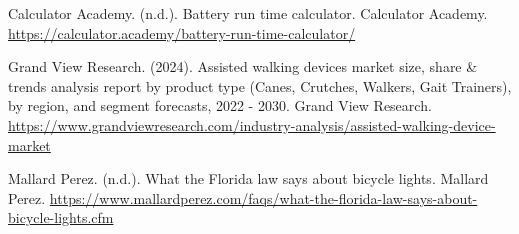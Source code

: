 \begin{thebibliography}{45}
	 Calculator Academy. (n.d.). Battery run time calculator. Calculator Academy. \href{https://calculator.academy/battery-run-time-calculator/}{https://calculator.academy/battery-run-time-calculator/}
	
	 Grand View Research. (2024). Assisted walking devices market size, share \& trends analysis report by product type (Canes, Crutches, Walkers, Gait Trainers), by region, and segment forecasts, 2022 - 2030. Grand View Research. \href{https://www.grandviewresearch.com/industry-analysis/assisted-walking-device-market}{https://www.grandviewresearch.com/industry-analysis/assisted-walking-device-market}
	
	 Mallard Perez. (n.d.). What the Florida law says about bicycle lights. Mallard Perez. \href{https://www.mallardperez.com/faqs/what-the-florida-law-says-about-bicycle-lights.cfm}{https://www.mallardperez.com/faqs/what-the-florida-law-says-about-bicycle-lights.cfm}
	
\end{thebibliography}

